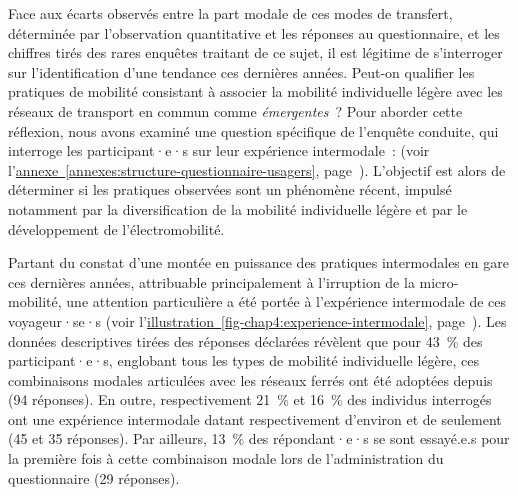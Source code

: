 \begin{refsegment}
Face aux écarts observés entre la part modale de ces modes de transfert, déterminée par l'observation quantitative et les réponses au questionnaire, et les chiffres tirés des rares enquêtes traitant de ce sujet, il est légitime de s'interroger sur l'identification d'une tendance ces dernières années. Peut-on qualifier les pratiques de mobilité consistant à associer la mobilité individuelle légère avec les réseaux de transport en commun comme \textsl{émergentes}~? Pour aborder cette réflexion, nous avons examiné une question spécifique de l'enquête conduite, qui interroge les participant·e·s sur leur expérience intermodale~:  (voir l'\hyperref[annexes:structure-questionnaire-usagers]{annexe~\ref{annexes:structure-questionnaire-usagers}}, page~\pageref{annexes:structure-questionnaire-usagers}). L'objectif est alors de déterminer si les pratiques observées sont un phénomène récent, impulsé notamment par la diversification de la mobilité individuelle légère et par le développement de l'électromobilité.%

Partant du constat d'une montée en puissance des pratiques intermodales en gare ces dernières années, attribuable principalement à l'irruption de la micro-mobilité, une attention particulière a été portée à l'expérience intermodale de ces voyageur·se·s (voir l'\hyperref[fig-chap4:experience-intermodale]{illustration~\ref{fig-chap4:experience-intermodale}}, page~\pageref{fig-chap4:experience-intermodale}). Les données descriptives tirées des réponses déclarées révèlent que pour 43~\% des participant·e·s, englobant tous les types de mobilité individuelle légère, ces combinaisons modales articulées avec les réseaux ferrés ont été adoptées depuis  (94 réponses). En outre, respectivement 21~\% et 16~\% des individus interrogés ont une expérience intermodale datant respectivement d'environ  et de  seulement (45 et 35 réponses). Par ailleurs, 13~\% des répondant·e·s se sont essayé.e.s pour la première fois à cette combinaison modale lors de l'administration du questionnaire (29 réponses).%


\end{refsegment}
